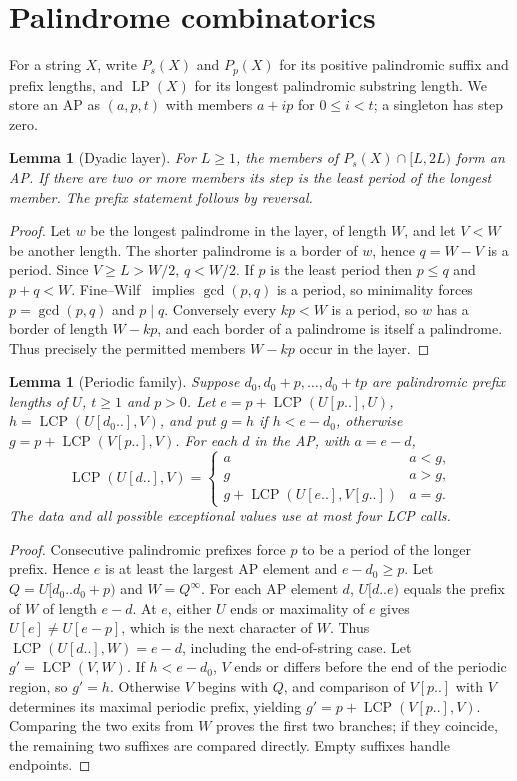 ﻿\documentclass[11pt]{article}
\theoremstyle{plain}
\newtheorem{lemma}[theorem]{Lemma}
\theoremstyle{remark}
\begin{document}
\section{Palindrome combinatorics}\label{sec:comb}
For a string $X$, write $P_s(X)$ and $P_p(X)$ for its positive palindromic suffix and prefix lengths, and $\operatorname{LP}(X)$ for its longest palindromic substring length. We store an AP as $(a,p,t)$ with members $a+ip$ for $0\le i<t$; a singleton has step zero.
\begin{lemma}[Dyadic layer]\label{dyadic}
For $L\ge1$, the members of $P_s(X)\cap[L,2L)$ form an AP. If there are two or more members its step is the least period of the longest member. The prefix statement follows by reversal.
\end{lemma}
\begin{proof}
Let $w$ be the longest palindrome in the layer, of length $W$, and let $V<W$ be another length. The shorter palindrome is a border of $w$, hence $q=W-V$ is a period. Since $V\ge L>W/2$, $q<W/2$. If $p$ is the least period then $p\le q$ and $p+q<W$. Fine--Wilf~\cite{FW} implies $\gcd(p,q)$ is a period, so minimality forces $p=\gcd(p,q)$ and $p\mid q$. Conversely every $kp<W$ is a period, so $w$ has a border of length $W-kp$, and each border of a palindrome is itself a palindrome. Thus precisely the permitted members $W-kp$ occur in the layer.
\end{proof}
\begin{lemma}[Periodic family]\label{family}
Suppose $d_0,d_0+p,\ldots,d_0+tp$ are palindromic prefix lengths of $U$, $t\ge1$ and $p>0$. Let $e=p+\operatorname{LCP}(U[p..],U)$, $h=\operatorname{LCP}(U[d_0..],V)$, and put $g=h$ if $h<e-d_0$, otherwise $g=p+\operatorname{LCP}(V[p..],V)$. For each $d$ in the AP, with $a=e-d$,
\[
\operatorname{LCP}(U[d..],V)=\begin{cases}a&a<g,\\g&a>g,\\g+\operatorname{LCP}(U[e..],V[g..])&a=g.\end{cases}
\]
The data and all possible exceptional values use at most four LCP calls.
\end{lemma}
\begin{proof}
Consecutive palindromic prefixes force $p$ to be a period of the longer prefix. Hence $e$ is at least the largest AP element and $e-d_0\ge p$. Let $Q=U[d_0..d_0+p)$ and $W=Q^\infty$. For each AP element $d$, $U[d..e)$ equals the prefix of $W$ of length $e-d$. At $e$, either $U$ ends or maximality of $e$ gives $U[e]\ne U[e-p]$, which is the next character of $W$. Thus $\operatorname{LCP}(U[d..],W)=e-d$, including the end-of-string case. Let $g'=\operatorname{LCP}(V,W)$. If $h<e-d_0$, $V$ ends or differs before the end of the periodic region, so $g'=h$. Otherwise $V$ begins with $Q$, and comparison of $V[p..]$ with $V$ determines its maximal periodic prefix, yielding $g'=p+\operatorname{LCP}(V[p..],V)$. Comparing the two exits from $W$ proves the first two branches; if they coincide, the remaining two suffixes are compared directly. Empty suffixes handle endpoints.
\end{proof}
\end{document}
